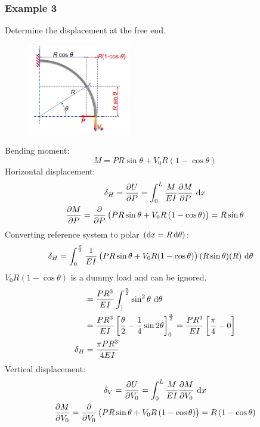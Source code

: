 \documentclass[class=report, crop=false, 12pt,a4paper]{standalone}
\begin{document}
\subsubsection{Example 3}
Determine the displacement at the free end.
\begin{figure}[H]
  \centering
  \includegraphics[width = 0.4\textwidth]{../img/diagram18.png}
  \caption{}
\end{figure}
Bending moment: 
\begin{equation}
  M = PR \sin\theta + V_0 R\left(1-\cos\theta\right)
\end{equation}
Horizontal displacement:
\begin{gather}
  \delta_H = \frac{\partial U}{\partial P} = \int_0^L \frac{M}{EI} \frac{\partial M}{\partial P} \, \dif x\\
  \frac{\partial M}{\partial P} = \frac{\partial }{\partial P} \left(PR\sin\theta + V_0R \left(1-\cos\theta\right)\right) = R\sin\theta
\end{gather}
Converting reference system to polar $\left(\dif x = R \dif \theta\right)$:
\begin{align}
  \delta_H  &= \int_0^{\frac{\pi}{2}} \frac{1}{EI} \left(PR\sin\theta + V_0R(1-\cos\theta)\right)(R\sin\theta)(R) \, \dif \theta
\end{align}
$V_0R(1-\cos\theta)$ is a dummy load and can be ignored.
\begin{align}
  &= \frac{PR^3}{EI} \int_)^{\frac{\pi}{2}} \sin^2\theta \, \dif \theta\\
  &= \frac{PR^3}{EI} \left[\frac{\theta}{2}-\frac{1}{4}\sin{2\theta}\right]_0^{\frac{\pi}{2}} = \frac{PR^3}{EI}\left[\frac{\pi}{4}-0\right]\\
  \delta_H &= \frac{\pi PR^3}{4EI}
\end{align}
Vertical displacement:
\begin{gather}
  \delta_V = \frac{\partial U}{\partial V_0} = \int_0^L \frac{M}{EI} \frac{\partial M}{\partial V_0} \, \dif x\\
  \frac{\partial M}{\partial V_0} = \frac{\partial }{\partial V_0}\left(PR\sin\theta + V_0R\left(1-\cos\theta\right)\right) = R\left(1-\cos\theta\right)
\end{gather}
\end{document}
